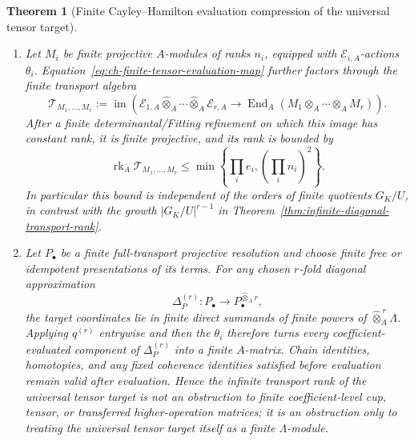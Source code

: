 \documentclass[11pt]{article}
\newtheorem{theorem}{Theorem}[section]
\theoremstyle{definition}
\begin{document}
\begin{theorem}[Finite Cayley--Hamilton evaluation compression of the universal tensor target]
\begin{enumerate}[label=\textnormal{(\roman*)}]
\item Let $M_i$ be finite projective $A$-modules of ranks $n_i$, equipped with
$\mathcal E_{i,A}$-actions $\theta_i$.  Equation~\eqref{eq:ch-finite-tensor-evaluation-map}
further factors through the finite transport algebra
\begin{equation}\label{eq:finite-ch-tensor-image-algebra}
 \mathcal T_{M_1,\ldots,M_r}
 :=\operatorname{im}\!\left(
 \mathcal E_{1,A}\widehat\otimes_A\cdots\widehat\otimes_A\mathcal E_{r,A}
 \longrightarrow
 \operatorname{End}_A(M_1\otimes_A\cdots\otimes_A M_r)
 \right).
\end{equation}
After a finite determinantal/Fitting refinement on which this image has constant
rank, it is finite projective, and its rank is bounded by
\begin{equation}\label{eq:ch-tensor-evaluation-rank-bound}
 \operatorname{rk}_A\mathcal T_{M_1,\ldots,M_r}
 \le
 \min\!\left\{
 \prod_i e_i,
 \left(\prod_i n_i\right)^2
 \right\}.
\end{equation}
In particular this bound is independent of the orders of finite quotients
$G_K/U$, in contrast with the growth $|G_K/U|^{r-1}$ in
Theorem~\ref{thm:infinite-diagonal-transport-rank}.

\item Let $P_\bullet$ be a finite full-transport projective resolution and choose
finite free or idempotent presentations of its terms.  For any chosen
$r$-fold diagonal approximation
\[
 \Delta_P^{(r)}:P_\bullet\longrightarrow
 P_\bullet^{\widehat\otimes_A r},
\]
the target coordinates lie in finite direct summands of finite powers of
$\widehat\otimes_A^{\,r}\Lambda$.  Applying $q^{(r)}$ entrywise and then the
$\theta_i$ therefore turns every coefficient-evaluated component of
$\Delta_P^{(r)}$ into a finite $A$-matrix.  Chain identities, homotopies, and
any fixed coherence identities satisfied before evaluation remain valid after
evaluation.  Hence the infinite transport rank of the universal tensor target
is not an obstruction to finite coefficient-level cup, tensor, or transferred
higher-operation matrices; it is an obstruction only to treating the
universal tensor target itself as a finite $\Lambda$-module.
\end{enumerate}
\end{theorem}
\end{document}
